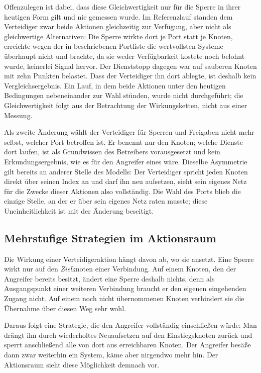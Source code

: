 Offenzulegen ist dabei, dass diese Gleichwertigkeit nur für die Sperre in ihrer
heutigen Form gilt und nie gemessen wurde. Im Referenzlauf standen dem
Verteidiger zwar beide Aktionen gleichzeitig zur Verfügung, aber nicht als
gleichwertige Alternativen: Die Sperre wirkte dort je Port statt je Knoten,
erreichte wegen der in  beschriebenen Portliste die
wertvollsten Systeme überhaupt nicht und brachte, da sie weder Verfügbarkeit
kostete noch belohnt wurde, keinerlei Signal hervor. Der Dienststopp dagegen
war auf sauberen Knoten mit zehn Punkten belastet. Dass der Verteidiger ihn
dort ablegte, ist deshalb kein Vergleichsergebnis. Ein Lauf, in dem beide
Aktionen unter den heutigen Bedingungen nebeneinander zur Wahl stünden, wurde
nicht durchgeführt; die Gleichwertigkeit folgt aus der Betrachtung der
Wirkungsketten, nicht aus einer Messung.

Als zweite Änderung wählt der Verteidiger für Sperren und Freigaben nicht mehr selbst,
welcher Port betroffen ist. Er benennt nur den Knoten; welche Dienste dort
laufen, ist als Grundwissen des Betreibers vorausgesetzt und kein
Erkundungsergebnis, wie es für den Angreifer eines wäre. Dieselbe Asymmetrie
gilt bereits an anderer Stelle des Modells: Der Verteidiger spricht jeden
Knoten direkt über seinen Index an und darf ihn neu aufsetzen, sieht sein
eigenes Netz für die Zwecke dieser Aktionen also vollständig. Die Wahl des
Ports blieb die einzige Stelle, an der er über sein eigenes Netz raten musste;
diese Uneinheitlichkeit ist mit der Änderung beseitigt.

\subsection{Mehrstufige Strategien im Aktionsraum}
\label{sec:mehrstufig}

Die Wirkung einer Verteidigeraktion hängt davon ab, wo sie ansetzt. Eine
Sperre wirkt nur auf den \emph{Ziel}knoten einer Verbindung. Auf einem Knoten,
den der Angreifer bereits besitzt, ändert eine Sperre deshalb nichts, denn als
Ausgangspunkt einer weiteren Verbindung braucht er den eigenen eingehenden
Zugang nicht. Auf einem noch nicht übernommenen Knoten verhindert sie die
Übernahme über diesen Weg sehr wohl.

Daraus folgt eine Strategie, die den Angreifer vollständig einschließen würde:
Man drängt ihn durch wiederholtes Neuaufsetzen auf den Einstiegsknoten zurück
und sperrt anschließend alle von dort aus erreichbaren Knoten. Der Angreifer
besäße dann zwar weiterhin ein System, käme aber nirgendwo mehr hin. Der
Aktionsraum sieht diese Möglichkeit demnach vor.

